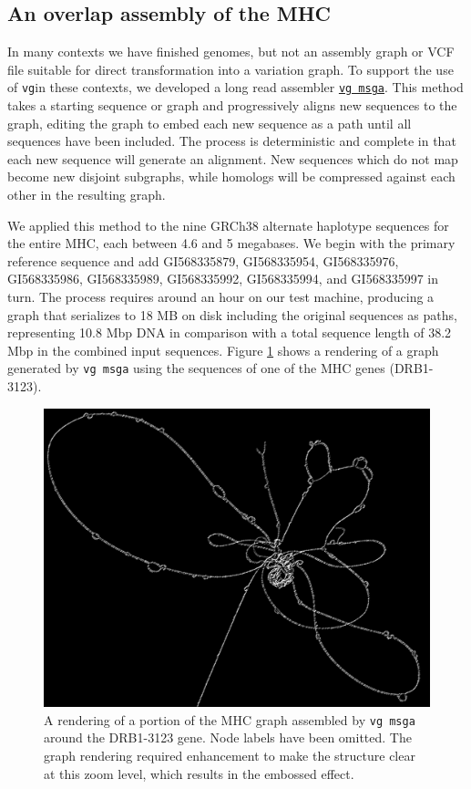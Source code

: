 \documentclass[12pt]{article}
\newcommand{\vg}{{\tt vg}}
\begin{document}
\subsection{An overlap assembly of the MHC}
\label{sec:MHC}

In many contexts we have finished genomes, but not an assembly graph or VCF file suitable for direct transformation into a variation graph. 
To support the use of \vg in these contexts,
we developed a long read assembler \href{https://github.com/vgteam/vg/wiki/Long-read-assemblies-using-vg-msga}{\tt vg msga}.
This method takes a starting sequence or graph and progressively aligns new sequences to the graph, editing the graph to embed each new sequence as a path until all sequences have been included.
The process is deterministic and complete in that each new sequence will generate an alignment.
New sequences which do not map become new disjoint subgraphs, while homologs will be compressed against each other in the resulting graph.

We applied this method to the nine GRCh38 alternate haplotype sequences for the entire MHC, each between 4.6 and 5 megabases.
We begin with the primary reference sequence and add GI568335879, GI568335954, GI568335976, GI568335986, GI568335989, GI568335992, GI568335994, and GI568335997 in turn.
The process requires around an hour on our test machine, producing a graph that serializes to 18 MB on disk including the original sequences as paths, representing 10.8 Mbp DNA in comparison with a total sequence length of 38.2 Mbp in the combined input sequences. 
Figure \ref{fig:DRB1-3123} shows a rendering of a graph generated by {\tt vg msga} using the sequences of one of the MHC genes (DRB1-3123).


\begin{figure}[t]
\centering
\includegraphics[width=1.0\textwidth]{figures/DRB1-3123}
\caption{\label{fig:DRB1-3123}
  A rendering of a portion of the MHC graph assembled by {\tt vg msga} around the DRB1-3123 gene.
  Node labels have been omitted. The graph rendering required enhancement to make the structure clear at this zoom level, which results in the embossed effect.
}
\end{figure}
\end{document}
